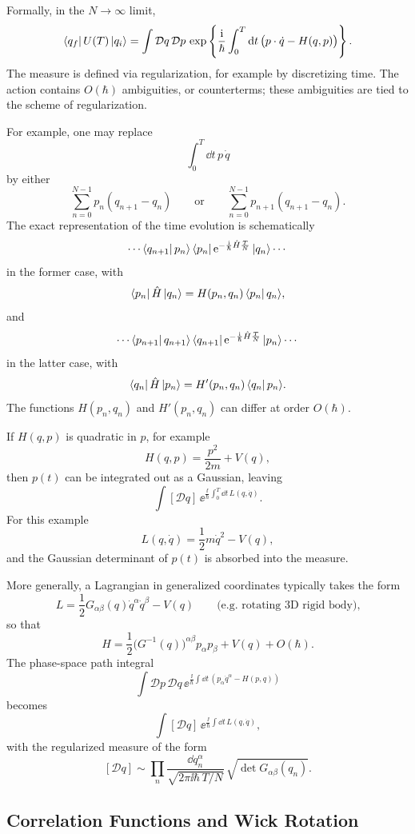 Formally, in the $N\to\infty$ limit,
\[
  \bra{q_f}U(T)\ket{q_i}
  =
  \int \mathcal Dq\,\mathcal Dp\,
  \exp\left\{
    \frac{\mathrm{i}}{\hbar}
    \int_0^T \mathrm{d} t\,
    \bigl(p\cdot\dot q-H(q,p)\bigr)
  \right\}.
\]
The measure is defined via regularization, for example by discretizing time.
The action contains $O(\hbar)$ ambiguities, or counterterms; these ambiguities
are tied to the scheme of regularization.

For example, one may replace
\[
  \int_0^T \dd t\,p\,\dot q
\]
by either
\[
  \sum_{n=0}^{N-1}p_n(q_{n+1}-q_n)
  \qquad\text{or}\qquad
  \sum_{n=0}^{N-1}p_{n+1}(q_{n+1}-q_n).
\]
The exact representation of the time evolution is schematically
\[
  \cdots
  \bra{q_{n+1}}p_n\rangle
  \bra{p_n}\mathrm{e}^{-\frac{\mathrm{i}}{\hbar}\hat H\frac{T}{N}}\ket{q_n}
  \cdots
\]
in the former case, with
\[
  \bra{p_n}\hat H\ket{q_n}
  =
  H(p_n,q_n)\bra{p_n}q_n\rangle,
\]
and
\[
  \cdots
  \bra{p_{n+1}}q_{n+1}\rangle
  \bra{q_{n+1}}\mathrm{e}^{-\frac{\mathrm{i}}{\hbar}\hat H\frac{T}{N}}\ket{p_n}
  \cdots
\]
in the latter case, with
\[
  \bra{q_n}\hat H\ket{p_n}
  =
  H'(p_n,q_n)\bra{q_n}p_n\rangle.
\]
The functions $H(p_n,q_n)$ and $H'(p_n,q_n)$ can differ at order $O(\hbar)$.

If $H(q,p)$ is quadratic in $p$, for example
\[
  H(q,p)=\frac{p^2}{2m}+V(q),
\]
then $p(t)$ can be integrated out as a Gaussian, leaving
\[
  \int [\mathcal Dq]\,
  \ee^{\frac{\ii}{\hbar}\int_0^T \dd t\,L(q,\dot q)}.
\]
For this example
\[
  L(q,\dot q)=\frac12 m\dot q^2-V(q),
\]
and the Gaussian determinant of $p(t)$ is absorbed into the measure.

More generally, a Lagrangian in generalized coordinates typically takes the
form
\[
  L=\frac12 G_{\alpha\beta}(q)\dot q^\alpha\dot q^\beta-V(q)
  \qquad
  \text{(e.g. rotating 3D rigid body),}
\]
so that
\[
  H=\frac12\bigl(G^{-1}(q)\bigr)^{\alpha\beta}p_\alpha p_\beta+V(q)+O(\hbar).
\]
The phase-space path integral
\[
  \int \mathcal Dp\,\mathcal Dq\,
  \ee^{\frac{\ii}{\hbar}\int \dd t\,(p_\alpha\dot q^\alpha-H(p,q))}
\]
becomes
\[
  \int [\mathcal Dq]\,
  \ee^{\frac{\ii}{\hbar}\int \dd t\,L(q,\dot q)},
\]
with the regularized measure of the form
\[
  [\mathcal Dq]
  \sim
  \prod_n
  \frac{\dd q_n^\alpha}{\sqrt{2\pi\ii\hbar\,T/N}}\,
  \sqrt{\det G_{\alpha\beta}(q_n)}.
\]

\subsection{Correlation Functions and Wick Rotation}

